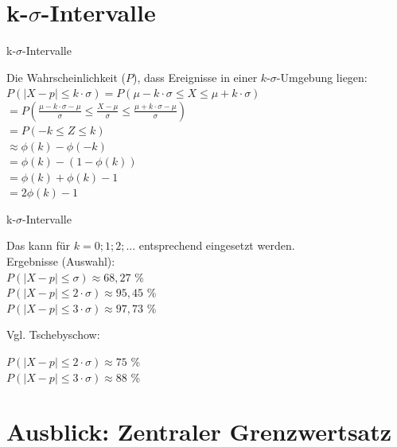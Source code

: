 \documentclass[14pt]{beamer}
\begin{document}
\section{k-$\sigma$-Intervalle}

\begin{frame}{k-$\sigma$-Intervalle}

Die Wahrscheinlichkeit ($P$), dass Ereignisse in einer $k$-$\sigma$-Umgebung liegen:
$ P(|X-p|\le k\cdot\sigma) = P(\mu-k\cdot\sigma\le X \le \mu + k\cdot\sigma)$\\
$ = P\left(\frac{\mu-k\cdot\sigma - \mu}{\sigma}\le \frac{X - \mu}{\sigma}\le \frac{\mu + k\cdot\sigma - \mu}{\sigma}\right)$\\
$ = P(-k \le Z \le k)$\\
$ \approx \phi(k) - \phi(-k)$\\
$ = \phi(k) - (1 - \phi(k))$\\
$ = \phi(k) + \phi(k) - 1$\\
$ = 2\phi(k)- 1$\\

\end{frame}

\begin{frame}{k-$\sigma$-Intervalle}

Das kann für $ k = {0;1;2;...}$ entsprechend eingesetzt werden.
 \\
Ergebnisse (Auswahl):
 \\
$ P(|X-p|\le \sigma) \approx 68,27$ \%\\
$ P(|X-p|\le 2\cdot\sigma) \approx 95,45$ \%\\
$ P(|X-p|\le 3\cdot\sigma) \approx 97,73$ \%

Vgl. Tschebyschow:

$ P(|X-p|\le 2\cdot\sigma) \approx 75$ \%\\
$ P(|X-p|\le 3\cdot\sigma) \approx 88$ \%\\

\end{frame}

\section{Ausblick: Zentraler Grenzwertsatz}


\end{document}
